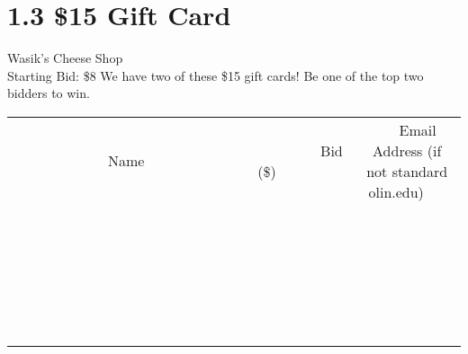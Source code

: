 \documentclass[11pt]{article}
\begin{document}
\section*{1.3 \$15 Gift Card}
Wasik's Cheese Shop
\\
Starting Bid: \$8
\newline
We have two of these \$15 gift cards! Be one of the top two bidders to win.
\\[6ex]
\begin{tabular}{c c c}
~~~~~~~~~~~~~Name~~~~~~~~~~~~~ & ~~~~~~~~~Bid (\$)~~~~~~~~~  & ~~~Email Address (if not standard olin.edu)~~~\\
 & & \\
\hline
 & & \\
\hline
 & & \\
\hline
 & & \\
\hline
 & & \\
\hline
 & & \\
\hline
 & & \\
\hline
 & & \\
\hline
 & & \\
\hline
 & & \\
\hline
 & & \\
\hline
 & & \\
\hline
 & & \\
\hline
 & & \\
\hline
 & & \\
\hline
 & & \\
\hline
 & & \\
\hline
 & & \\
\hline
 & & \\
\hline
 & & \\
\hline
 & & \\
\hline
 & & \\
\hline
 & & \\
\hline
 & & \\
\hline
 & & \\
\hline
 & & \\
\hline
\end{tabular}
\newpage
\end{document}
